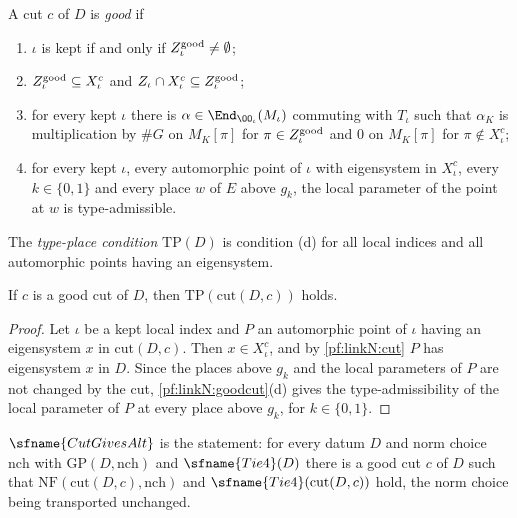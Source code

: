 \begin{definition}\label{pf:linkN:goodcut}
A cut $c$ of $D$ is \emph{good} if
\begin{enumerate}[label=(\alph*)]
\item $\iota$ is kept if and only if $Z^{\mathrm{good}}_\iota\ne\emptyset$;
\item $Z^{\mathrm{good}}_\iota\subseteq X^c_\iota$ and $Z_\iota\cap X^c_\iota\subseteq Z^{\mathrm{good}}_\iota$;
\item for every kept $\iota$ there is $\alpha\in\End_{\OO_\iota}(M_\iota)$ commuting with $T_\iota$ such that $\alpha_K$ is
multiplication by $\#G$ on $M_K[\pi]$ for $\pi\in Z^{\mathrm{good}}_\iota$ and $0$ on $M_K[\pi]$ for $\pi\notin X^c_\iota$;
\item for every kept $\iota$, every automorphic point of $\iota$ with eigensystem in $X^c_\iota$, every $k\in\{0,1\}$ and every
place $w$ of $E$ above $g_k$, the local parameter of the point at $w$ is type-admissible.
\end{enumerate}
The \emph{type-place condition} $\mathrm{TP}(D)$ is condition (d) for all local indices and all automorphic points having an
eigensystem.
\end{definition}

\begin{lemma}\label{pf:linkN:cutTP}
If $c$ is a good cut of $D$, then $\mathrm{TP}(\mathrm{cut}(D,c))$ holds.
\end{lemma}

\begin{proof}
Let $\iota$ be a kept local index and $P$ an automorphic point of $\iota$ having an eigensystem $x$ in $\mathrm{cut}(D,c)$.
Then $x\in X^c_\iota$, and by \cref{pf:linkN:cut} $P$ has eigensystem $x$ in $D$. Since the places above $g_k$ and the local
parameters of $P$ are not changed by the cut, \cref{pf:linkN:goodcut}(d) gives the type-admissibility of the local parameter
of $P$ at every place above $g_k$, for $k\in\{0,1\}$.
\end{proof}

\begin{definition}\label{pf:linkN:CGA}
$\sfname{CutGivesAlt}$ is the statement: for every datum $D$ and norm choice $\mathrm{nch}$ with $\mathrm{GP}(D,\mathrm{nch})$
and $\sfname{Tie4}(D)$ there is a good cut $c$ of $D$ such that $\mathrm{NF}(\mathrm{cut}(D,c),\mathrm{nch})$ and
$\sfname{Tie4}(\mathrm{cut}(D,c))$ hold, the norm choice being transported unchanged.
\end{definition}

